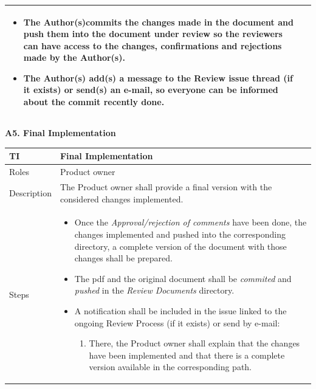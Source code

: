 \documentclass{template/openetcs_article}
\begin{document}
\begin{flushleft}
\begin{supertabular}{|m{2cm}|m{13cm}|}
\begin{itemize}
\begin{enumerate}
\begin{enumerate}
\end{enumerate}
\end{enumerate}
\item The Author(s)commits the changes made in the document and push them into the document under review so the reviewers can have access to the changes, confirmations and rejections made by the Author(s).
\item The Author(s) add(s) a message to the Review issue thread (if it exists) or send(s) an e-mail, so everyone can be informed about the commit recently done. 
\end{itemize}
\\\hline
\end{supertabular}
\end{flushleft}

\textbf{A5. Final Implementation}

\begin{flushleft}
\tablefirsthead{}
\tablehead{}
\tabletail{}
\tablelasttail{}
\begin{supertabular}[H]{|m{2cm}|m{13cm}|}
\hline
{}
TI & 
Final Implementation
\\\hline
Roles &
Product owner
\\\hline
Description &
The Product owner shall provide a final version with the considered changes implemented.  
\\\hline
Steps &
\begin{itemize}
\item Once the {\it Approval/rejection of comments} have been done, the changes implemented and pushed into the corresponding directory, a complete version of the document with those changes shall be prepared.
\item The pdf and the original document shall be {\it commited} and {\it pushed} in the {\it Review Documents} directory.
\item A notification shall be included in the issue linked to the ongoing Review Process (if it exists) or send by e-mail: 
\begin{enumerate}
\item There, the Product owner shall explain that the changes have been implemented and that there is a complete version available in the corresponding path.
\end{enumerate}
\end{itemize}
\\\hline
\end{supertabular}
\end{flushleft}
\end{document}
